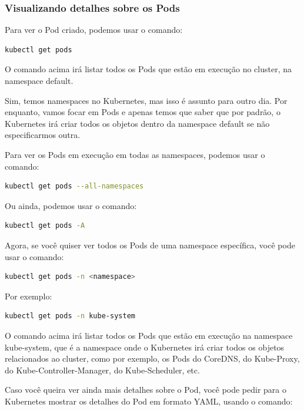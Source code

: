 \documentclass[12pt,a4paper]{article}
\begin{document}
\subsubsection{Visualizando detalhes sobre os Pods}
\label{sec:visualizando_pod}

Para ver o Pod criado, podemos usar o comando:

\begin{lstlisting}[language=bash]
kubectl get pods
\end{lstlisting}

O comando acima irá listar todos os Pods que estão em execução no cluster, na namespace default.

Sim, temos namespaces no Kubernetes, mas isso é assunto para outro dia. Por enquanto, vamos focar em Pods e apenas temos que saber que por padrão, o Kubernetes irá criar todos os objetos dentro da namespace default se não especificarmos outra.

Para ver os Pods em execução em todas as namespaces, podemos usar o comando:

\begin{lstlisting}[language=bash]
kubectl get pods --all-namespaces
\end{lstlisting}

Ou ainda, podemos usar o comando:

\begin{lstlisting}[language=bash]
kubectl get pods -A
\end{lstlisting}

Agora, se você quiser ver todos os Pods de uma namespace específica, você pode usar o comando:

\begin{lstlisting}[language=bash]
kubectl get pods -n <namespace>
\end{lstlisting}

Por exemplo:

\begin{lstlisting}[language=bash]
kubectl get pods -n kube-system
\end{lstlisting}

O comando acima irá listar todos os Pods que estão em execução na namespace kube-system, que é a namespace onde o Kubernetes irá criar todos os objetos relacionados ao cluster, como por exemplo, os Pods do CoreDNS, do Kube-Proxy, do Kube-Controller-Manager, do Kube-Scheduler, etc.

Caso você queira ver ainda mais detalhes sobre o Pod, você pode pedir para o Kubernetes mostrar os detalhes do Pod em formato YAML, usando o comando:
\end{document}
